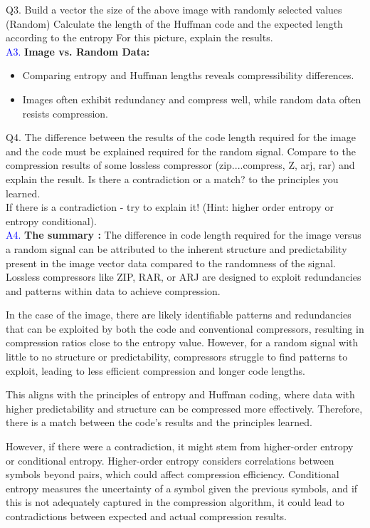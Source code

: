 \documentclass[letterpaper, 12pt]{article}
\begin{document}
Q3. Build a vector the size of the above image with randomly selected values (Random) Calculate the length of the Huffman code and the expected length according to the entropy For this picture, explain the results. \\
\textcolor{blue}{A3.} \textbf{Image vs. Random Data:}
\begin{itemize}
        \item Comparing entropy and Huffman lengths reveals compressibility differences.
        \item Images often exhibit redundancy and compress well, while random data often resists compression.
\end{itemize}
Q4. The difference between the results of the code length required for the image and the code must be explained required for the random signal. Compare to the compression results of some lossless compressor (zip....compress, Z, arj, rar) and explain the result. Is there a contradiction or a match? to the principles you learned. \\
If there is a contradiction - try to explain it! (Hint: higher order entropy or entropy
conditional). \\
\textcolor{blue}{A4.} \textbf{The summary : }The difference in code length required for the image versus a random signal can be attributed to the inherent structure and predictability present in the image vector data compared to the randomness of the signal. Lossless compressors like ZIP, RAR, or ARJ are designed to exploit redundancies and patterns within data to achieve compression.

In the case of the image, there are likely identifiable patterns and redundancies that can be exploited by both the code and conventional compressors, resulting in compression ratios close to the entropy value. However, for a random signal with little to no structure or predictability, compressors struggle to find patterns to exploit, leading to less efficient compression and longer code lengths.

This aligns with the principles of entropy and Huffman coding, where data with higher predictability and structure can be compressed more effectively. Therefore, there is a match between the code's results and the principles learned.

However, if there were a contradiction, it might stem from higher-order entropy or conditional entropy. Higher-order entropy considers correlations between symbols beyond pairs, which could affect compression efficiency. Conditional entropy measures the uncertainty of a symbol given the previous symbols, and if this is not adequately captured in the compression algorithm, it could lead to contradictions between expected and actual compression results.
\end{document}
